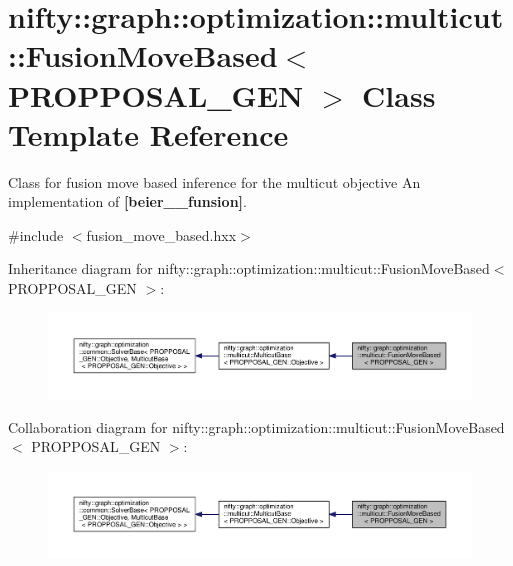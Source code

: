 \hypertarget{classnifty_1_1graph_1_1optimization_1_1multicut_1_1FusionMoveBased}{}\section{nifty\+:\+:graph\+:\+:optimization\+:\+:multicut\+:\+:Fusion\+Move\+Based$<$ P\+R\+O\+P\+P\+O\+S\+A\+L\+\_\+\+G\+E\+N $>$ Class Template Reference}
\label{classnifty_1_1graph_1_1optimization_1_1multicut_1_1FusionMoveBased}


Class for fusion move based inference for the multicut objective An implementation of {\bfseries [beier\+\_\+\_\+funsion]}.  




{\ttfamily \#include $<$fusion\+\_\+move\+\_\+based.\+hxx$>$}



Inheritance diagram for nifty\+:\+:graph\+:\+:optimization\+:\+:multicut\+:\+:Fusion\+Move\+Based$<$ P\+R\+O\+P\+P\+O\+S\+A\+L\+\_\+\+G\+E\+N $>$\+:\nopagebreak
\begin{figure}[H]
\begin{center}
\leavevmode
\includegraphics[width=350pt]{classnifty_1_1graph_1_1optimization_1_1multicut_1_1FusionMoveBased__inherit__graph}
\end{center}
\end{figure}


Collaboration diagram for nifty\+:\+:graph\+:\+:optimization\+:\+:multicut\+:\+:Fusion\+Move\+Based$<$ P\+R\+O\+P\+P\+O\+S\+A\+L\+\_\+\+G\+E\+N $>$\+:\nopagebreak
\begin{figure}[H]
\begin{center}
\leavevmode
\includegraphics[width=350pt]{classnifty_1_1graph_1_1optimization_1_1multicut_1_1FusionMoveBased__coll__graph}
\end{center}
\end{figure}
